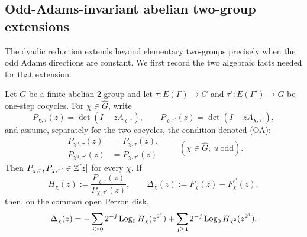 \subsection{Odd-Adams-invariant abelian two-group extensions}
\label{sec:odd-adams-sampling}

The dyadic reduction extends beyond elementary two-groups precisely when the
odd Adams directions are constant.  We first record the two algebraic facts
needed for that extension.

\begin{lemma}
\label{lem:odd-adams-mobius-collapse}
Let \(G\) be a finite abelian \(2\)-group and let
\(\tau:E(\Gamma)\to G\) and \(\tau':E(\Gamma')\to G\) be one-step
cocycles.  For \(\chi\in\widehat G\), write
\[
 P_{\chi,\tau}(z)=\det(I-zA_{\chi,\tau}),\qquad
 P_{\chi,\tau'}(z)=\det(I-zA_{\chi,\tau'}),
\]
and assume, separately for the two cocycles, the condition denoted (OA):
\begin{equation}\label{eq:odd-adams-determinant-invariance}
 \begin{aligned}
 P_{\chi^u,\tau}(z)&=P_{\chi,\tau}(z),\\
 P_{\chi^u,\tau'}(z)&=P_{\chi,\tau'}(z)
 \end{aligned}
 \qquad(\chi\in\widehat G,\ u\ \text{odd}).
\end{equation}
Then \(P_{\chi,\tau},P_{\chi,\tau'}\in\mathbb{Z}[z]\) for every \(\chi\).
If
\[
 H_\chi(z):=\frac{P_{\chi,\tau}(z)}{P_{\chi,\tau'}(z)},\qquad
 \Delta_\chi(z):=F_\chi^\tau(z)-F_\chi^{\tau'}(z),
\]
then, on the common open Perron disk,
\begin{equation}\label{eq:odd-adams-mobius-collapse}
 \Delta_\chi(z)
 =-\sum_{j\ge0}2^{-j}\operatorname{Log}_0H_\chi(z^{2^j})
  +\sum_{j\ge1}2^{-j}\operatorname{Log}_0H_{\chi^2}(z^{2^j}).
\end{equation}
\end{lemma}

